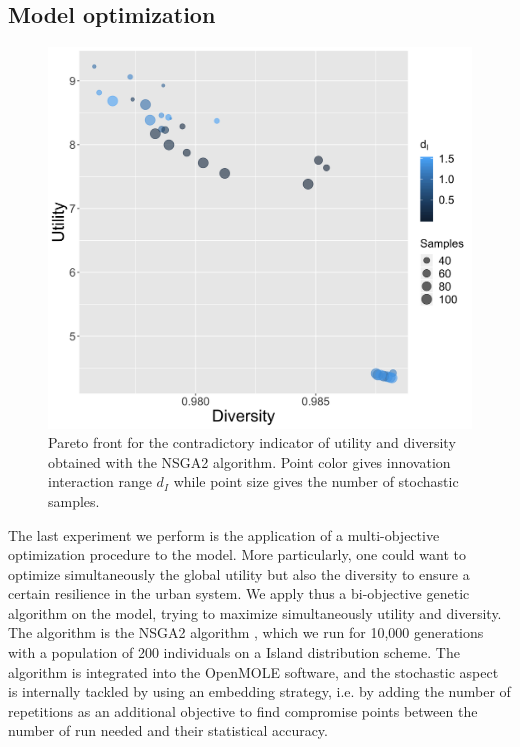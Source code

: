 \documentclass[letterpaper]{article}
\begin{document}
\subsection{Model optimization}

\begin{figure}[t]
	\centering
	\includegraphics[width=\linewidth]{paretoDiversity-Utility_colorinnovationDecay.png}
	\caption{Pareto front for the contradictory indicator of utility and diversity obtained with the NSGA2 algorithm. Point color gives innovation interaction range $d_I$ while point size gives the number of stochastic samples.\label{fig:pareto}}
\end{figure}

The last experiment we perform is the application of a multi-objective optimization procedure to the model. More particularly, one could want to optimize simultaneously the global utility but also the diversity to ensure a certain resilience in the urban system. We apply thus a bi-objective genetic algorithm on the model, trying to maximize simultaneously utility and diversity. The algorithm is the NSGA2 algorithm \citep{deb2002fast}, which we run for 10,000 generations with a population of 200 individuals on a Island distribution scheme. The algorithm is integrated into the OpenMOLE software, and the stochastic aspect is internally tackled by using an embedding strategy, i.e. by adding the number of repetitions as an additional objective to find compromise points between the number of run needed and their statistical accuracy.
\end{document}
